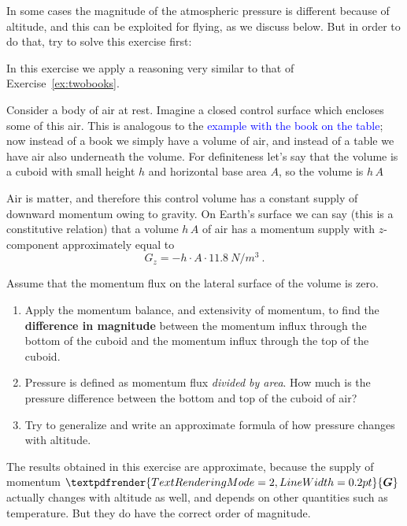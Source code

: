 \documentclass[a4paper,12pt,%
onecolumn,oneside,%
british%
]{memoir}
\renewcommand*{\bm}[1]{\textpdfrender{TextRenderingMode=2,LineWidth=0.2pt}{\boldsymbol{#1}}}
\renewcommand*{\|}[1][]{\nonscript\:#1\vert\nonscript\:\mathopen{}}
\newcommand*{\sect}{\S}%
\renewcommand*{\autoref}[2]{\sidepar{\vspace{-1ex}\footnotesize{\color{blue}\faIcon{%
angle-right%
}\enskip\sect~\ref{#1} page~\pageref{#1}}}\textcolor{blue}{#2}}
\newcommand*{\yG}{\bm{G}}
\begin{document}
In some cases the magnitude of the atmospheric pressure is different because of altitude, and this can be exploited for flying, as we discuss below. But in order to do that, try to solve this exercise first:
\begin{exercise}[label={ex:atmosphericpressure}]
  In this exercise we apply a reasoning very similar to that of Exercise~\ref{ex:twobooks}.

  Consider a body of air at rest. Imagine a closed control surface which encloses some of this air. This is analogous to the \autoref{sec:bal_momentum_statics}{example with the book on the table}; now instead of a book we simply have a volume of air, and instead of a table we have air also underneath the volume. For definiteness let's say that the volume is a cuboid with small height $h$ and horizontal base area $A$, so the volume is $h\,A$

  Air is matter, and therefore this control volume has a constant supply of downward momentum owing to gravity. On Earth's surface we can say (this is a constitutive relation) that a volume $h\,A$ of air has a momentum supply with $z$-component approximately equal to
  \begin{equation*}
    G_{z} = -h\cdot A \cdot \qty{11.8}{N/m^{3}}\ .
  \end{equation*}

  Assume that the momentum flux on the lateral surface of the volume is zero.
  \begin{enumerate}[exerc]
  \item Apply the momentum balance, and extensivity of momentum, to find the \textbf{difference in magnitude} between the momentum influx through the bottom of the cuboid and the momentum influx through the top of the cuboid.
    \item Pressure is defined as momentum flux \emph{divided by area}. How much is the pressure difference between the bottom and top of the cuboid of air?
    \item Try to generalize and write an approximate formula of how pressure changes with altitude.
    \end{enumerate}

    {\color{red}\footnotesize{}\enskip The results obtained in this exercise are approximate, because the supply of momentum $\yG$ actually changes with altitude as well, and depends on other quantities such as temperature. But they do have the correct order of magnitude.\par}
\end{exercise}
\end{document}
